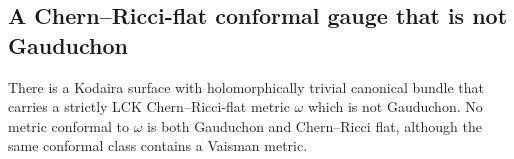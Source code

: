 \subsection{A Chern--Ricci-flat conformal gauge that is not Gauduchon}
\label{subsec:lck-kodaira-gauges}

\begin{example}\label{ex:lck-kodaira-incompatible-gauges}
There is a Kodaira surface with holomorphically trivial canonical bundle that carries a strictly LCK Chern--Ricci-flat metric $\omega$ which is not Gauduchon. No metric conformal to $\omega$ is both Gauduchon and Chern--Ricci flat, although the same conformal class contains a Vaisman metric.
\end{example}
